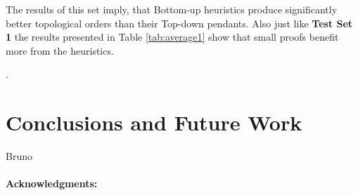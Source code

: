 \documentclass{llncs}
\begin{document}
The results of this set imply, that Bottom-up heuristics produce significantly better topological orders than their Top-down pendants.
Also just like \textbf{Test Set 1} the results presented in Table \ref{tab:average1} show that small proofs benefit more from the heuristics.


.

\section{Conclusions and Future Work}

Bruno


\vspace{-10pt}
\paragraph{Acknowledgments:}





\end{document}
